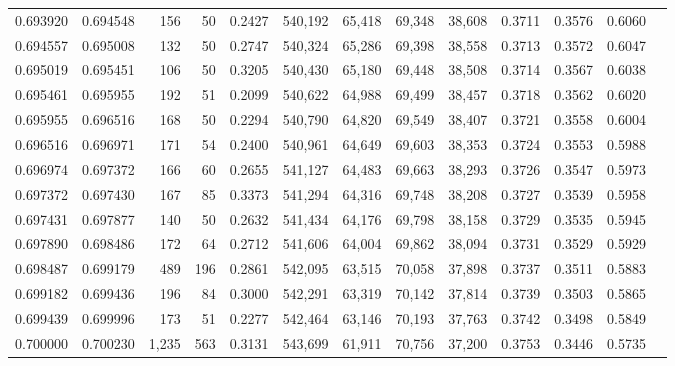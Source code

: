 \begin{tabular}{rrrrrrrrrrrrr}
0.693920 & 0.694548 &   156 &  50 &                                     0.2427 & 540,192 &  65,418 &  69,348 &  38,608 & 0.3711 & 0.3576 & 0.6060 \\
0.694557 & 0.695008 &   132 &  50 &                                     0.2747 & 540,324 &  65,286 &  69,398 &  38,558 & 0.3713 & 0.3572 & 0.6047 \\
0.695019 & 0.695451 &   106 &  50 &                                     0.3205 & 540,430 &  65,180 &  69,448 &  38,508 & 0.3714 & 0.3567 & 0.6038 \\
0.695461 & 0.695955 &   192 &  51 &                                     0.2099 & 540,622 &  64,988 &  69,499 &  38,457 & 0.3718 & 0.3562 & 0.6020 \\
0.695955 & 0.696516 &   168 &  50 &                                     0.2294 & 540,790 &  64,820 &  69,549 &  38,407 & 0.3721 & 0.3558 & 0.6004 \\
0.696516 & 0.696971 &   171 &  54 &                                     0.2400 & 540,961 &  64,649 &  69,603 &  38,353 & 0.3724 & 0.3553 & 0.5988 \\
0.696974 & 0.697372 &   166 &  60 &                                     0.2655 & 541,127 &  64,483 &  69,663 &  38,293 & 0.3726 & 0.3547 & 0.5973 \\
0.697372 & 0.697430 &   167 &  85 &                                     0.3373 & 541,294 &  64,316 &  69,748 &  38,208 & 0.3727 & 0.3539 & 0.5958 \\
0.697431 & 0.697877 &   140 &  50 &                                     0.2632 & 541,434 &  64,176 &  69,798 &  38,158 & 0.3729 & 0.3535 & 0.5945 \\
0.697890 & 0.698486 &   172 &  64 &                                     0.2712 & 541,606 &  64,004 &  69,862 &  38,094 & 0.3731 & 0.3529 & 0.5929 \\
0.698487 & 0.699179 &   489 & 196 &                                     0.2861 & 542,095 &  63,515 &  70,058 &  37,898 & 0.3737 & 0.3511 & 0.5883 \\
0.699182 & 0.699436 &   196 &  84 &                                     0.3000 & 542,291 &  63,319 &  70,142 &  37,814 & 0.3739 & 0.3503 & 0.5865 \\
0.699439 & 0.699996 &   173 &  51 &                                     0.2277 & 542,464 &  63,146 &  70,193 &  37,763 & 0.3742 & 0.3498 & 0.5849 \\
0.700000 & 0.700230 & 1,235 & 563 &                                     0.3131 & 543,699 &  61,911 &  70,756 &  37,200 & 0.3753 & 0.3446 & 0.5735 \\

\end{tabular}
